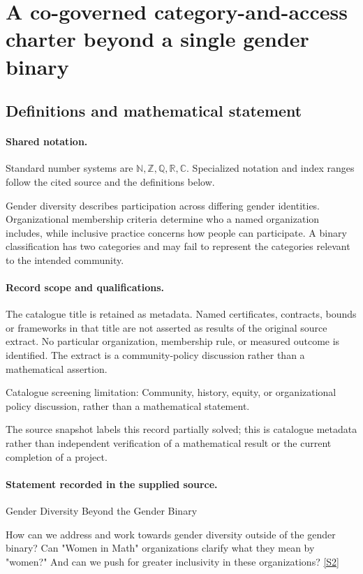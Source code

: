 \documentclass[11pt]{article}
\newcommand{\sref}[2]{\hyperlink{source:#1:#2}{[S#2]}}
\begin{document}
\section{A co-governed category-and-access charter beyond a single gender binary}\label{statement}

\subsection{Definitions and mathematical statement}

\paragraph{Shared notation.}Standard number systems are $\mathbb N,\mathbb Z,\mathbb Q,\mathbb R,\mathbb C$. Specialized notation and index ranges follow the cited source and the definitions below.


Gender diversity describes participation across differing gender identities. Organizational membership criteria determine who a named organization includes, while inclusive practice concerns how people can participate. A binary classification has two categories and may fail to represent the categories relevant to the intended community.
\paragraph{Record scope and qualifications.}
The catalogue title is retained as metadata. Named certificates, contracts, bounds or frameworks in that title are not asserted as results of the original source extract.
No particular organization, membership rule, or measured outcome is identified. The extract is a community-policy discussion rather than a mathematical assertion.

Catalogue screening limitation: Community, history, equity, or organizational policy discussion, rather than a mathematical statement.

The source snapshot labels this record partially solved; this is catalogue metadata rather than independent verification of a mathematical result or the current completion of a project.
\paragraph{Statement recorded in the supplied source.}
Gender Diversity Beyond the Gender Binary

How can we address and work towards gender diversity outside of the gender binary? Can "Women in Math" organizations clarify what they mean by "women?" And can we push for greater inclusivity in these organizations? \sref{statement}{2}
\end{document}
